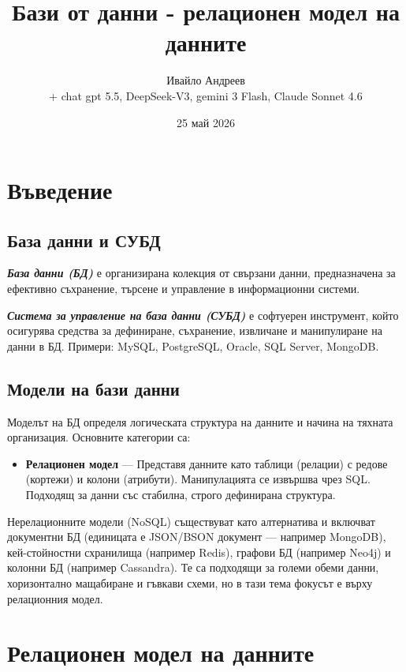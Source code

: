 \documentclass{scrartcl}
\title{Бази от данни - релационен модел на данните}
\author{Ивайло Андреев \\+ chat gpt 5.5, DeepSeek-V3, gemini 3 Flash, Claude Sonnet 4.6}
\date{25 май 2026}
\begin{document}
\maketitle

\tableofcontents
\newpage

\begin{FlushLeft}

\section{Въведение}

\subsection{База данни и СУБД}

\textbf{\textit{База данни (БД)}} е организирана колекция от свързани данни, предназначена за ефективно съхранение, търсене и управление в информационни системи.

\textbf{\textit{Система за управление на база данни (СУБД)}} е софтуерен инструмент, който осигурява средства за дефиниране, съхранение, извличане и манипулиране на данни в БД. Примери: MySQL, PostgreSQL, Oracle, SQL Server, MongoDB.

\subsection{Модели на бази данни}

Моделът на БД определя логическата структура на данните и начина на тяхната организация. Основните категории са:

\begin{itemize}
    \item \textbf{Релационен модел} --- Представя данните като таблици (релации) с редове (кортежи) и колони (атрибути). Манипулацията се извършва чрез SQL. Подходящ за данни със стабилна, строго дефинирана структура.
\end{itemize}

Нерелационните модели (NoSQL) съществуват като алтернатива и включват документни БД (единицата е JSON/BSON документ — например MongoDB), кей-стойностни схранилища (например Redis), графови БД (например Neo4j) и колонни БД (например Cassandra). Те са подходящи за големи обеми данни, хоризонтално мащабиране и гъвкави схеми, но в тази тема фокусът е върху релационния модел.

\section{Релационен модел на данните}


\end{FlushLeft}
\end{document}
